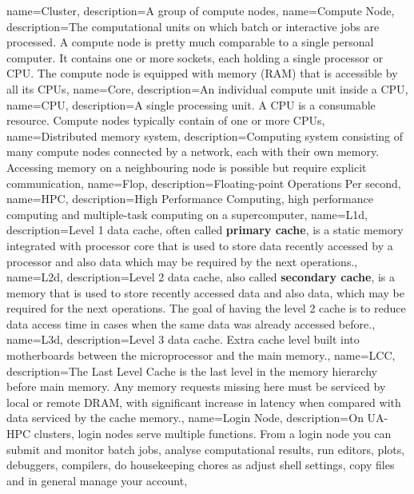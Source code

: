 {
  name={Cluster},
  description={A group of compute nodes},
}
{
  name={Compute Node},
  description={The computational units on which batch or interactive jobs are processed. A compute node is pretty much comparable to a single personal computer. It contains one or more sockets, each holding a single processor or CPU. The compute node is equipped with memory (RAM) that is accessible by all its CPUs},
}
{
  name={Core},
  description={An individual compute unit inside a CPU},
}
{
  name={CPU},
  description={A single processing unit. A CPU is a consumable resource. Compute nodes typically contain of one or more CPUs},
}
{
  name={Distributed memory system},
  description={Computing system consisting of many compute nodes connected by a network, each with their own memory. Accessing memory on a neighbouring node is possible but require explicit communication},
}
{
  name={Flop},
  description={Floating-point Operations Per second},
}
{
  name={HPC},
  description={High Performance Computing, high performance computing and multiple-task computing on a supercomputer},
}
{
  name={L1d},
  description={Level 1 data cache, often called \textbf{primary cache}, is a static memory integrated with processor core that is used to store data recently accessed by a processor and also data which may be required by the next operations.},
}
{
  name={L2d},
  description={Level 2 data cache, also called \textbf{secondary cache}, is a memory that is used to store recently accessed data and also data, which may be required for the next operations. The goal of having the level 2 cache is to reduce data access time in cases when the same data was already accessed before.},
}
{
  name={L3d},
  description={Level 3 data cache. Extra cache level built into motherboards between the microprocessor and the main memory.},
}
{
  name={LCC},
  description={The Last Level Cache is the last level in the memory hierarchy before main memory. Any memory requests missing here must be serviced by local or remote DRAM, with significant increase in latency when compared with data serviced by the cache memory.},
}
{
  name={Login Node},
  description={On UA-HPC clusters, login nodes serve multiple functions. From a login node you can submit and monitor batch jobs, analyse computational results, run editors, plots, debuggers, compilers, do housekeeping chores as adjust shell settings, copy files and in general manage your account},
}
